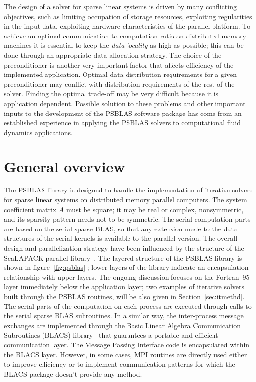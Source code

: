 The design of a solver for sparse linear systems is driven by many
conflicting objectives, such as limiting occupation of storage
resources, exploiting regularities in the input data, exploiting
hardware characteristics of the parallel platform.  To achieve an
optimal communication to computation ratio on distributed memory
machines it is essential to keep the {\em data locality} as high as
possible; this can be done through an appropriate data allocation
strategy.  The choice of the preconditioner is another very important
factor that affects efficiency of the implemented application. Optimal
data distribution requirements for a given preconditioner may conflict
with distribution requirements of the rest of the solver. Finding the
optimal trade-off may be very difficult because it is application
dependent.  Possible solution to these problems and other important
inputs to the development of the PSBLAS software package has come from
an established experience in applying the PSBLAS solvers to
computational fluid dynamics applications.

\section{General overview}
\label{sec:overview} 
The PSBLAS library is designed to handle the implementation of
iterative solvers for sparse linear systems on distributed memory
parallel computers.  The system coefficient matrix $A$ must be square;
it may be real or complex, nonsymmetric, and its sparsity pattern
needs not to be symmetric.  The serial computation parts are based on
the serial sparse BLAS, so that any extension made to the data
structures of the serial kernels is available to the parallel
version. The overall design and parallelization strategy have been
influenced by the structure of the ScaLAPACK parallel
library~\cite{scalapack}.  The layered structure of the PSBLAS library
is shown in figure~\ref{fig:psblas} ; lower layers of the library
indicate an encapsulation relationship with upper layers. The ongoing
discussion focuses on the Fortran~95 layer immediately below the
application layer; two examples of iterative solvers built through the
PSBLAS routines, will be also given in Section~\ref{sec:itmethd}.  The
serial parts of the computation on each process are executed through
calls to the serial sparse BLAS subroutines. In a similar way, the
inter-process message exchanges are implemented through the Basic
Linear Algebra Communication Subroutines (BLACS) library~\cite{BLACS}
that guarantees a portable and efficient communication layer. The
Message Passing Interface code is encapsulated within the BLACS
layer. However, in some cases, MPI routines are directly used either
to improve efficiency or to implement communication patterns for which
the BLACS package doesn't provide any method.

